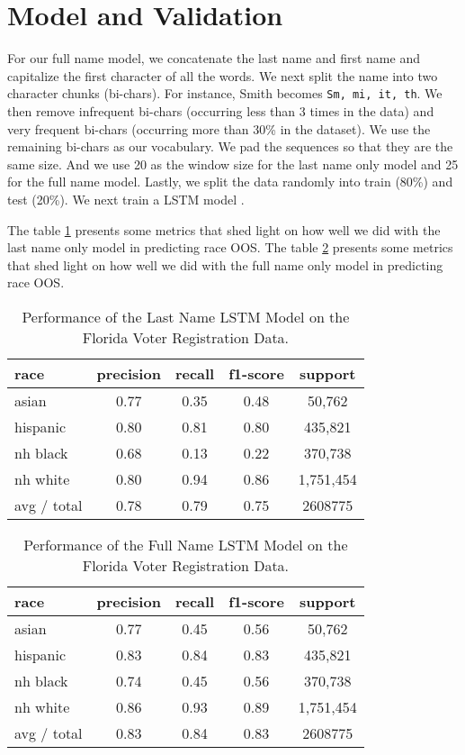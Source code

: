 \documentclass[12pt, letterpaper]{article}
\begin{document}
\section*{Model and Validation}
For our full name model, we concatenate the last name and first name and capitalize the first character of all the words. We next split the name into two character chunks (bi-chars). For instance, Smith becomes {\tt Sm, mi, it, th}. We then remove infrequent bi-chars (occurring less than 3 times in the data) and very frequent bi-chars (occurring more than 30\% in the dataset). We use the remaining bi-chars as our vocabulary. We pad the sequences so that they are the same size. And we use 20 as the window size for the last name only model and 25 for the full name model. Lastly, we split the data randomly into train (80\%) and test (20\%). We next train a LSTM model \citep{graves2005framewise, gers1999learning}. 

The table \ref{table:2} presents some metrics that shed light on how well we did with the last name only model in predicting race OOS.  The table \ref{table:3} presents some metrics that shed light on how well we did with the full name only model in predicting race OOS.  

\begin{table}[h!]
\centering
\caption{Performance of the Last Name LSTM Model on the Florida Voter Registration Data.}
\begin{tabular}{ l c c c c }
\hline	
    race & precision & recall & f1-score & support \\
\hline
   asian & 0.77 & 0.35 & 0.48 & 50,762 \\
   hispanic &  0.80 & 0.81 & 0.80 & 435,821 \\
   nh black & 0.68 & 0.13 & 0.22 & 370,738 \\
   nh white & 0.80 & 0.94 & 0.86 & 1,751,454 \\
avg / total     &    0.78 & 0.79  &  0.75 & 2608775 \\
\hline
\end{tabular}
\label{table:2}
\end{table}

\begin{table}[h!]
\centering
\caption{Performance of the Full Name LSTM Model on the Florida Voter Registration Data.}
\begin{tabular}{ l c c c c }
\hline	
   race & precision & recall & f1-score & support\\
\hline
   asian & 0.77  & 0.45 & 0.56   &    50,762\\
   hispanic  &  0.83 & 0.84 & 0.83  &    435,821\\
   nh black &  0.74 &  0.45 & 0.56  &    370,738\\
   nh white  & 0.86  & 0.93 & 0.89  &   1,751,454\\

avg / total     &    0.83    &    0.84    &    0.83  &   2608775\\
\hline
\end{tabular}
\label{table:3}
\end{table}
\end{document}
